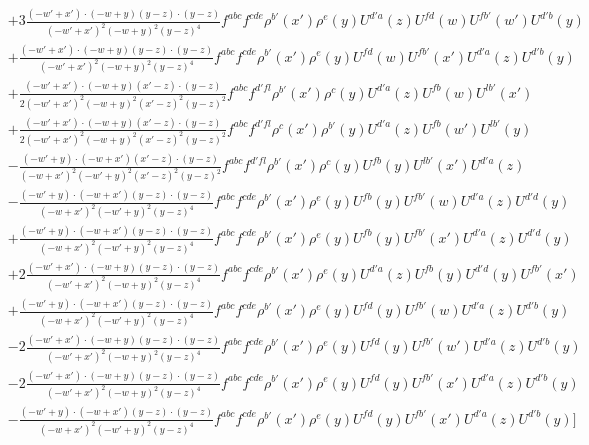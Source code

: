 \documentclass[aps,prd,amsmath,amssymb,nofootinbib]{revtex4-2}
\numberwithin{equation}{section}
\begin{document}
\begin{align}
    &+ 3 \frac{( - w' + x') \cdot ( - w + y) (y - z) \cdot (y - z)}{( - w' + x')^{2} ( - w + y)^{2} (y - z)^{4}} f^{a b c} f^{c d e} \rho^{b'}(x') \rho^{e}(y) U^{d'a}(z) U^{fd}(w) U^{f b'}(w') U^{d' b}(y)\nonumber\\
    &+  \frac{( - w' + x') \cdot ( - w + y) (y - z) \cdot (y - z)}{( - w' + x')^{2} ( - w + y)^{2} (y - z)^{4}} f^{a b c} f^{c d e} \rho^{b'}(x') \rho^{e}(y) U^{f d}(w) U^{f b'}(x') U^{d' a}(z) U^{d' b}(y)\nonumber\\
    &+ \frac{( - w' + x') \cdot ( - w + y) (x' - z) \cdot (y - z)}{2 ( - w' + x')^{2} ( - w + y)^{2} (x' - z)^{2} (y - z)^{2}} f^{a b c} f^{d' f l} \rho^{b'}(x') \rho^{c}(y) U^{d'a}(z) U^{f b}(w) U^{lb'}(x') \nonumber\\
      &+ \frac{( - w' + x') \cdot ( - w + y) (x' - z) \cdot (y - z)}{2 ( - w' + x')^{2} ( - w + y)^{2} (x' - z)^{2} (y - z)^{2}} f^{a b c} f^{d' f l} \rho^{c}(x') \rho^{b'}(y) U^{d'a}(z) U^{fb}(w') U^{lb'}(y) \nonumber\\
      &-  \frac{( - w' + y) \cdot ( - w + x') (x' - z) \cdot (y - z)}{( - w + x')^{2} ( - w' + y)^{2} (x' - z)^{2} (y - z)^{2}} f^{a b c} f^{d' f l} \rho^{b'}(x') \rho^{c}(y) U^{f b}(y) U^{lb'}(x') U^{d' a}(z) \nonumber\\
      &- \frac{( - w' + y) \cdot ( - w + x') (y - z) \cdot (y - z)}{( - w + x')^{2} ( - w' + y)^{2} (y - z)^{4}} f^{a b c} f^{c d e} \rho^{b'}(x') \rho^{e}(y) U^{f b}(y) U^{f b'}(w) U^{d' a}(z) U^{d' d}(y)\nonumber\\
      &+ \frac{( - w' + y) \cdot ( - w + x') (y - z) \cdot (y - z)}{( - w + x')^{2} ( - w' + y)^{2} (y - z)^{4}} f^{a b c} f^{c d e} \rho^{b'}(x') \rho^{e}(y) U^{f b}(y) U^{f b'}(x') U^{d' a}(z) U^{d' d}(y)\nonumber\\
       &+ 2 \frac{( - w' + x') \cdot ( - w + y) (y - z) \cdot (y - z)}{( - w' + x')^{2} ( - w + y)^{2} (y - z)^{4}} f^{a b c} f^{c d e} \rho^{b'}(x') \rho^{e}(y) U^{d'a}(z) U^{fb}(y) U^{d'd}(y) U^{fb'}(x')\nonumber\\
    &+ \frac{( - w' + y) \cdot ( - w + x') (y - z) \cdot (y - z)}{( - w + x')^{2} ( - w' + y)^{2} (y - z)^{4}} f^{a b c} f^{c d e} \rho^{b'}(x') \rho^{e}(y) U^{f d}(y) U^{f b'}(w) U^{d' a}(z) U^{d' b}(y)\nonumber\\
    &- 2 \frac{( - w' + x') \cdot ( - w + y) (y - z) \cdot (y - z)}{( - w' + x')^{2} ( - w + y)^{2} (y - z)^{4}} f^{a b c} f^{c d e} \rho^{b'}(x') \rho^{e}(y) U^{f d}(y) U^{f b'}(w') U^{d' a}(z) U^{d' b}(y)\nonumber\\
    &- 2 \frac{( - w' + x') \cdot ( - w + y) (y - z) \cdot (y - z)}{( - w' + x')^{2} ( - w + y)^{2} (y - z)^{4}} f^{a b c} f^{c d e} \rho^{b'}(x') \rho^{e}(y) U^{f d}(y) U^{f b'}(x') U^{d' a}(z) U^{d' b}(y)\nonumber\\
    &- \frac{( - w' + y) \cdot ( - w + x') (y - z) \cdot (y - z)}{( - w + x')^{2} ( - w' + y)^{2} (y - z)^{4}} f^{a b c} f^{c d e} \rho^{b'}(x') \rho^{e}(y) U^{f d}(y) U^{f b'}(x') U^{d' a}(z) U^{d' b}(y)\Bigg]
\end{align}
\end{document}
